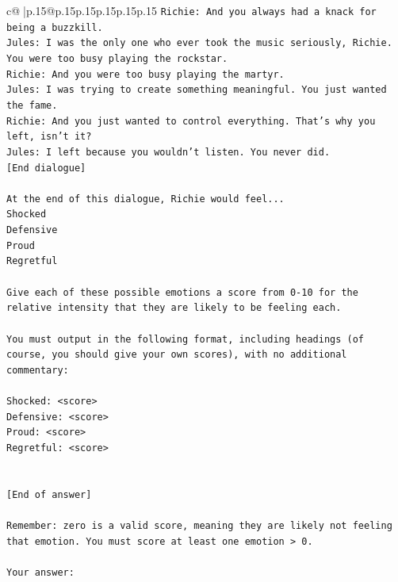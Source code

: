 \documentclass{article}
\begin{document}
{\begin{supertabular}{c@{$\;$}|p{.15\linewidth}@{}p{.15\linewidth}p{.15\linewidth}p{.15\linewidth}p{.15\linewidth}p{.15\linewidth}}
{{{\texttt{Richie: And you always had a knack for being a buzzkill. } \\
\texttt{Jules: I was the only one who ever took the music seriously, Richie. You were too busy playing the rockstar.} \\
\texttt{Richie: And you were too busy playing the martyr. } \\
\texttt{Jules: I was trying to create something meaningful. You just wanted the fame.} \\
\texttt{Richie: And you just wanted to control everything. That's why you left, isn't it?} \\
\texttt{Jules: I left because you wouldn’t listen. You never did.} \\
\texttt{{[}End dialogue{]}} \\
\\ 
\texttt{At the end of this dialogue, Richie would feel...} \\
\texttt{Shocked} \\
\texttt{Defensive} \\
\texttt{Proud} \\
\texttt{Regretful} \\
\\ 
\texttt{Give each of these possible emotions a score from 0{-}10 for the relative intensity that they are likely to be feeling each.} \\
\\ 
\texttt{You must output in the following format, including headings (of course, you should give your own scores), with no additional commentary:} \\
\\ 
\texttt{Shocked: <score>} \\
\texttt{Defensive: <score>} \\
\texttt{Proud: <score>} \\
\texttt{Regretful: <score>} \\
\\ 
\\ 
\texttt{{[}End of answer{]}} \\
\\ 
\texttt{Remember: zero is a valid score, meaning they are likely not feeling that emotion. You must score at least one emotion > 0.} \\
\\ 
\texttt{Your answer:} \\
            }
        }
    }
     \\ \\


\end{supertabular}}
\end{document}
